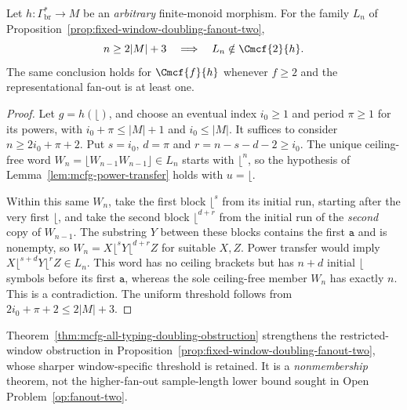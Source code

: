 \begin{theorem}
\label{thm:mcfg-all-typing-doubling-obstruction}
Let $h:\Gamma_{\mathrm{br}}^*\to M$ be an
\emph{arbitrary} finite-monoid morphism.
For the family $L_n$ of
Proposition~\ref{prop:fixed-window-doubling-fanout-two},
\[
 n\ge2|M|+3\quad\Longrightarrow\quad
 L_n\notin\Cmcf{2}{h}.
\]
The same conclusion holds for $\Cmcf{f}{h}$ whenever
$f\ge2$ and the representational fan-out is at least one.
\end{theorem}
\begin{proof}
Let $g=h(\lfloor)$, and choose an eventual index
$i_0\ge1$ and period $\pi\ge1$ for its powers,
with $i_0+\pi\le |M|+1$ and $i_0\le|M|$.
It suffices to consider $n\ge2i_0+\pi+2$.
Put $s=i_0$, $d=\pi$ and $r=n-s-d-2\ge i_0$.
The unique ceiling-free word
$W_n=\lfloor W_{n-1}W_{n-1}\rfloor\in L_n$
starts with $\lfloor^n$, so the hypothesis of
Lemma~\ref{lem:mcfg-power-transfer} holds with $u=\lfloor$.

Within this same $W_n$, take the first block
$\lfloor^s$ from its initial run, starting after
the very first $\lfloor$, and take the second
block $\lfloor^{d+r}$ from the initial run of
the \emph{second} copy of $W_{n-1}$.
The substring $Y$ between these blocks contains
the first $\mathtt a$ and is nonempty, so
$W_n=X\lfloor^sY\lfloor^{d+r}Z$ for suitable $X,Z$.
Power transfer would imply
$X\lfloor^{s+d}Y\lfloor^rZ\in L_n$.
This word has no ceiling brackets but has $n+d$
initial $\lfloor$ symbols before its first $\mathtt a$,
whereas the sole ceiling-free member $W_n$ has
exactly $n$.  This is a contradiction.
The uniform threshold follows from
$2i_0+\pi+2\le2|M|+3$.
\end{proof}

\begin{remark}
Theorem~\ref{thm:mcfg-all-typing-doubling-obstruction}
strengthens the restricted-window obstruction in
Proposition~\ref{prop:fixed-window-doubling-fanout-two},
whose sharper window-specific threshold is retained.
It is a \emph{nonmembership} theorem, not the
higher-fan-out sample-length lower bound sought in
Open Problem~\ref{op:fanout-two}.
\end{remark}

